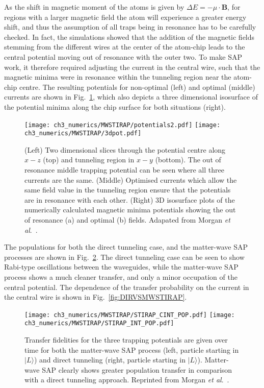 As the shift in magnetic moment of the atoms is given by $\Delta E = -\mu\cdot\mathbf{B}$, for regions with a larger magnetic field the atom will experience a greater energy shift, and thus the assumption of all traps being in resonance has to be carefully checked. In fact, the simulations showed that the addition of the magnetic fields stemming from the different wires at the center of the atom-chip leads to the central potential moving out of resonance with the outer two. To make SAP work, it therefore required adjusting the current in the central wire, such that the magnetic minima were in resonance within the tunneling region near the atom-chip centre. The resulting potentials for non-optimal (left) and optimal (middle) currents are shown in Fig.~\ref{fig:equaloptcurrent}, which also depicts a three dimensional isosurface of the potential minima along the chip surface for both situations (right).

\begin{figure}[tb]
    \centering
  \texttt{[image: ch3\_numerics/MWSTIRAP/potentials2.pdf]}
  \texttt{[image: ch3\_numerics/MWSTIRAP/3dpot.pdf]}
  \caption{(Left) Two dimensional slices through the potential centre along $x-z$ (top) and tunneling region in $x-y$ (bottom). The out of resonance middle trapping potential can be seen where all three currents are the same. (Middle) Optimised currents which allow the same field value in the tunneling region ensure that the potentials are in resonance with each other. (Right) 3D isosurface plots of the numerically calculated magnetic minima potentials showing the out of resonance (a) and optimal (b) fields. Adapated from Morgan {\textit{et al}.}~\cite{AO:Morgan_pra_2013}.}
  \label{fig:equaloptcurrent}
\end{figure}
The populations for both the direct tunneling case, and the matter-wave SAP processes are shown in Fig.~\ref{fig:mwsVsDT}. The direct tunneling case can be seen to show Rabi-type oscillations between the waveguides, while the matter-wave SAP process shows a much cleaner transfer, and only a minor occupation of the central potential. The dependence of the transfer probability on the current in the central wire is shown in Fig.~\ref{fig:DIRVSMWSTIRAP}.


\begin{figure}[tb]
    \centering
  \texttt{[image: ch3\_numerics/MWSTIRAP/STIRAP\_CINT\_POP.pdf]}
  \texttt{[image: ch3\_numerics/MWSTIRAP/STIRAP\_INT\_POP.pdf]}
  \caption{Transfer fidelities for the three trapping potentials are given over time for both the matter-wave SAP process (left, particle starting in $ |L\rangle$) and direct tunneling (right, particle starting in $ |L\rangle$). Matter-wave SAP clearly shows greater population transfer in comparison with a direct tunneling approach. Reprinted from Morgan {\textit{et al}.}~\cite{AO:Morgan_pra_2013}.}
  \label{fig:mwsVsDT}
\end{figure}

